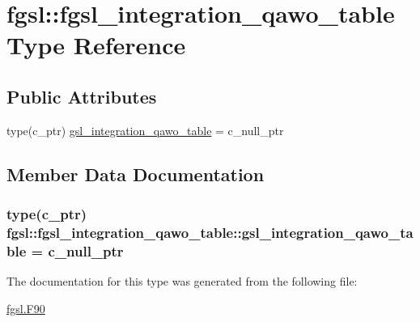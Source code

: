 \hypertarget{structfgsl_1_1fgsl__integration__qawo__table}{\section{fgsl\-:\-:fgsl\-\_\-integration\-\_\-qawo\-\_\-table Type Reference}
\label{structfgsl_1_1fgsl__integration__qawo__table}
}
\subsection*{Public Attributes}
\begin{DoxyCompactItemize}
\item 
type(c\-\_\-ptr) \hyperlink{structfgsl_1_1fgsl__integration__qawo__table_a969624ba9782f8667be590e4863ea262}{gsl\-\_\-integration\-\_\-qawo\-\_\-table} = c\-\_\-null\-\_\-ptr
\end{DoxyCompactItemize}


\subsection{Member Data Documentation}
\hypertarget{structfgsl_1_1fgsl__integration__qawo__table_a969624ba9782f8667be590e4863ea262}{
\subsubsection[{gsl\-\_\-integration\-\_\-qawo\-\_\-table}]{\setlength{\rightskip}{0pt plus 5cm}type(c\-\_\-ptr) fgsl\-::fgsl\-\_\-integration\-\_\-qawo\-\_\-table\-::gsl\-\_\-integration\-\_\-qawo\-\_\-table = c\-\_\-null\-\_\-ptr}}\label{structfgsl_1_1fgsl__integration__qawo__table_a969624ba9782f8667be590e4863ea262}


The documentation for this type was generated from the following file\-:\begin{DoxyCompactItemize}
\item 
\hyperlink{fgsl_8F90}{fgsl.\-F90}\end{DoxyCompactItemize}
